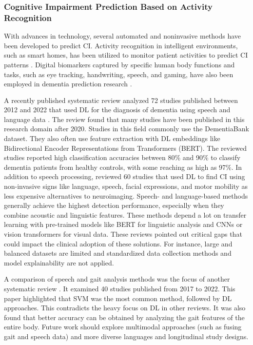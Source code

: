 \subsubsection{Cognitive Impairment Prediction Based on Activity Recognition}
With advances in technology, several automated and noninvasive methods have been developed to predict CI. Activity recognition in intelligent environments, such as smart homes, has been utilized to monitor patient activities to predict CI patterns \cite{Khan2021Prediction}. Digital biomarkers captured by specific human body functions and tasks, such as eye tracking, handwriting, speech, and gaming, have also been employed in dementia prediction research \cite{Ding2022Digital}. 

A recently published systematic review analyzed 72 studies published between 2012 and 2022 that used DL for the diagnosis of dementia using speech and language data \cite{Shi2023Speech}. The review found that many studies have been published in this research domain after 2020. Studies in this field commonly use the DementiaBank dataset. They also often use feature extraction with DL embeddings like Bidirectional Encoder Representations from Transformers (\acrshort{BERT}). The reviewed studies reported high classification accuracies between 80\% and 90\% to classify dementia patients from healthy controls, with some reaching as high as 97\%. In addition to speech processing,  reviewed 60 studies that used DL to find CI using non-invasive signs like language, speech, facial expressions, and motor mobility as less expensive alternatives to neuroimaging. Speech- and language-based methods generally achieve the highest detection performance, especially when they combine acoustic and linguistic features. These methods depend a lot on transfer learning with pre-trained models like BERT for linguistic analysis and CNNs or vision transformers for visual data. These reviews pointed out critical gaps that could impact the clinical adoption of these solutions. For instance, large and balanced datasets are limited and standardized data collection methods and model explainability are not applied.

A comparison of speech and gait analysis methods was the focus of another systematic review \cite{Al-Hammadi2024Machine}. It examined 40 studies published from 2017 to 2022. This paper highlighted that SVM was the most common method, followed by DL approaches. This contradicts the heavy focus on DL in other reviews. It was also found that better accuracy can be obtained by analyzing the gait features of the entire body. Future work should explore multimodal approaches (such as fusing gait and speech data) and more diverse languages and longitudinal study designs.

